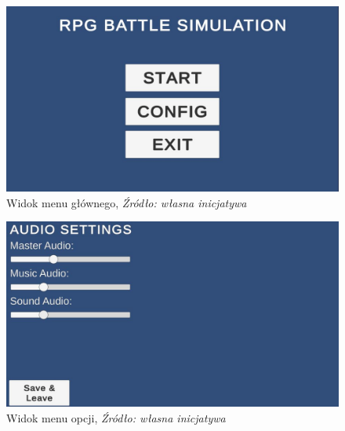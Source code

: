 \documentclass{SGGW-thesis}
\begin{document}
\begin{figure}[H]
  \includegraphics[width=1\textwidth]{menuscreen1.JPG}
  \caption{Widok menu głównego, \textit{Źródło: własna inicjatywa}}
\end{figure}
\begin{figure}[H]
  \includegraphics[width=1\textwidth]{menuscreen2.JPG}
  \caption{Widok menu opcji, \textit{Źródło: własna inicjatywa}}
\end{figure}
\pagebreak
\end{document}
